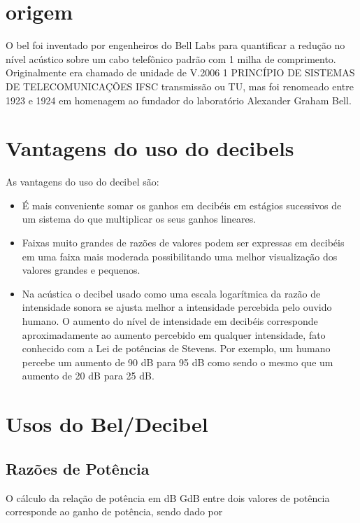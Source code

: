\documentclass[
	article,			%
	11pt,				%
	oneside,			%
	a4paper,			%
	english,			%
	brazil,				%
	sumario=tradicional
	]{abntex2}
\begin{document}
\section{origem}

    O bel foi inventado por engenheiros do Bell Labs para quantificar a
redução no nível acústico sobre um cabo telefônico padrão com 1 milha
de comprimento. Originalmente era chamado de unidade de
V.2006 1
PRINCÍPIO DE SISTEMAS DE TELECOMUNICAÇÕES IFSC
transmissão ou TU, mas foi renomeado entre 1923 e 1924 em
homenagem ao fundador do laboratório Alexander Graham Bell.


\section{Vantagens do uso do decibels}

    As vantagens do uso do decibel são:
\begin{itemize}
    \item   É mais conveniente somar os ganhos em decibéis em estágios
    sucessivos de um sistema do que multiplicar os seus ganhos
    lineares.
    
    \item     Faixas muito grandes de razões de valores podem ser expressas em
    decibéis em uma faixa mais moderada possibilitando uma melhor
    visualização dos valores grandes e pequenos.
    
    \item   Na acústica o decibel usado como uma escala logarítmica da razão
    de intensidade sonora se ajusta melhor a intensidade percebida pelo
    ouvido humano. O aumento do nível de intensidade em decibéis
    corresponde aproximadamente ao aumento percebido em qualquer
    intensidade, fato conhecido com a Lei de potências de Stevens. Por
    exemplo, um humano percebe um aumento de 90 dB para 95 dB
    como sendo o mesmo que um aumento de 20 dB para 25 dB.
\end{itemize}


\section{Usos do Bel/Decibel}
\subsection{Razões de Potência}
    O cálculo da relação de potência em dB GdB entre dois valores de
    potência corresponde ao ganho de potência, sendo dado por
    
\end{document}
